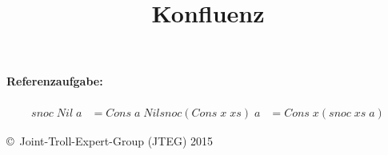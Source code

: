 \documentclass{article}
\title{Konfluenz}
\date{ }
\begin{document}
	\maketitle
		\textbf{Referenzaufgabe:} \\
		\\
		\begin{align*}
			snoc\;Nil\;a 			&= Cons\;a\;Nil
			snoc(Cons\;x\;xs)\;a	&= Cons\;x(snoc\;xs\;a)
		\end{align*}
	\begin{tiny}
	\copyright\ Joint-Troll-Expert-Group (JTEG) 2015
	\end{tiny}
\end{document}

